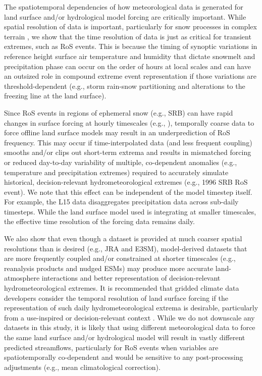 \documentclass[nhess, manuscript]{copernicus}
\begin{document}
The spatiotemporal dependencies of how meteorological data is generated for land surface and/or hydrological model forcing are critically important. 
While spatial resolution of data is important, particularly for snow processes in complex terrain \citep{henn2018an,Woodburn2021}, we show that the time resolution of data is just as critical for transient extremes, such as RoS events.
This is because the timing of synoptic variations in reference height surface air temperature and humidity that dictate snowmelt and precipitation phase can occur on the order of hours at local scales and can have an outsized role in compound extreme event representation if those variations are threshold-dependent (e.g., storm rain-snow partitioning and alterations to the freezing line at the land surface).

Since RoS events in regions of ephemeral snow (e.g., SRB) can have rapid changes in surface forcing at hourly timescales (e.g., \citet{leathers1998severe}), temporally coarse data to force offline land surface models may result in an underprediction of RoS frequency. 
This may occur if time-interpolated data (and less frequent coupling) smooths and/or clips out short-term extrema and results in mismatched forcing or reduced day-to-day variability of multiple, co-dependent anomalies (e.g., temperature and precipitation extremes) required to accurately simulate historical, decision-relevant hydrometeorological extremes (e.g., 1996 SRB RoS event). We note that this effect can be independent of the model timestep itself. For example, the L15 data disaggregates precipitation data across sub-daily timesteps. While the land surface model used is integrating at smaller timescales, the effective time resolution of the forcing data remains daily.

We also show that even though a dataset is provided at much coarser spatial resolutions than is desired (e.g., JRA and E3SM), model-derived datasets that are more frequently coupled and/or constrained at shorter timescales (e.g., reanalysis products and nudged ESMs) may produce more accurate land-atmosphere interactions and better representation of decision-relevant hydrometeorological extremes. 
It is recommended that gridded climate data developers consider the temporal resolution of land surface forcing if the representation of such daily hydrometeorological extrema is desirable, particularly from a use-inspired or decision-relevant context \citep{Jagannathan2021}.
While we do not downscale any datasets in this study, it is likely that using different meteorological data to force the same land surface and/or hydrological model will result in vastly different predicted streamflows, particularly for RoS events when variables are spatiotemporally co-dependent and would be sensitive to any post-processing adjustments (e.g., mean climatological correction). 
\end{document}
